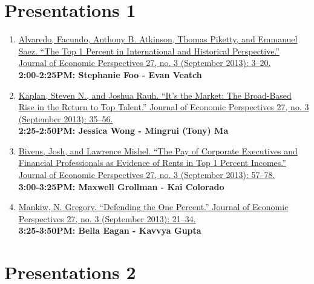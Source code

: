 \documentclass[]{book}
\theoremstyle{definition}
\theoremstyle{definition}
\theoremstyle{definition}
\theoremstyle{remark}
\begin{document}
\hypertarget{presentations1}{\chapter{Presentations
1}\label{presentations1}}

\begin{enumerate}
\def\labelenumi{\arabic{enumi}.}
\item
  \href{https://doi.org/10.1257/jep.27.3.3}{Alvaredo, Facundo, Anthony
  B. Atkinson, Thomas Piketty, and Emmanuel Saez. ``The Top 1 Percent in
  International and Historical Perspective.'' Journal of Economic
  Perspectives 27, no. 3 (September 2013): 3--20.}\\
  \textbf{2:00-2:25PM: Stephanie Foo - Evan Veatch}
\item
  \href{https://doi.org/10.1257/jep.27.3.35}{Kaplan, Steven N., and
  Joshua Rauh. ``It's the Market: The Broad-Based Rise in the Return to
  Top Talent.'' Journal of Economic Perspectives 27, no. 3 (September
  2013): 35--56.}\\
  \textbf{2:25-2:50PM: Jessica Wong - Mingrui (Tony) Ma}
\item
  \href{https://doi.org/10.1257/jep.27.3.57}{Bivens, Josh, and Lawrence
  Mishel. ``The Pay of Corporate Executives and Financial Professionals
  as Evidence of Rents in Top 1 Percent Incomes.'' Journal of Economic
  Perspectives 27, no. 3 (September 2013): 57--78.}\\
  \textbf{3:00-3:25PM: Maxwell Grollman - Kai Colorado}
\item
  \href{https://doi.org/10.1257/jep.27.3.21}{Mankiw, N. Gregory.
  ``Defending the One Percent.'' Journal of Economic Perspectives 27,
  no. 3 (September 2013): 21--34.}\\
  \textbf{3:25-3:50PM: Bella Eagan - Kavvya Gupta}
\end{enumerate}

\hypertarget{presentations2}{\chapter{Presentations
2}\label{presentations2}}
\end{document}
